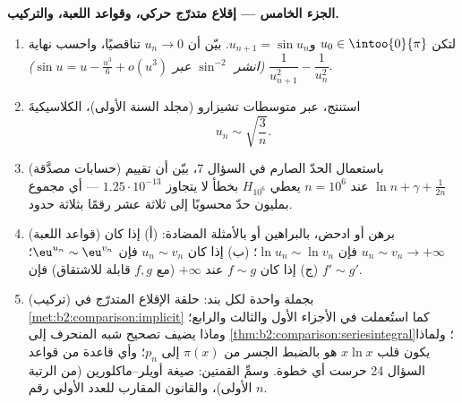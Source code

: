 \begin{problem}
\medskip
\noindent\textbf{الجزء الخامس --- إقلاع متدرّج حركي، وقواعد
اللعبة، والتركيب.}
\begin{enumerate}[resume]
  \item لتكن $u_0 \in \intoo{0}{\pi}$ و$u_{n+1} = \sin u_n$.
        بيّن أن $u_n \to 0$ تناقصيًا، واحسب نهاية
        $\dfrac{1}{u_{n+1}^2} - \dfrac{1}{u_n^2}$ \emph{(انشر
        $\sin^{-2}$ عبر $\sin u = u - \frac{u^3}6 + o(u^3)$)}.
  \item استنتج، عبر متوسطات تشيزارو (مجلد السنة الأولى)، الكلاسيكيةَ
        \[
        u_n \sim \sqrt{\frac{3}{n}} .
        \]
  \item (حسابات مصدَّقة) باستعمال الحدّ الصارم في السؤال 7،
        بيّن أن تقييم $\ln n + \gamma + \frac1{2n}$ عند $n
        = 10^6$ يعطي $H_{10^6}$ بخطأ لا يتجاوز
        $1.25\cdot10^{-13}$ --- أي مجموع بمليون حدّ محسوبًا إلى
        ثلاثة عشر رقمًا بثلاثة حدود.
  \item (قواعد اللعبة) برهن أو ادحض، بالبراهين أو
        بالأمثلة المضادة: (أ) إذا كان $u_n \sim v_n \to +\infty$ فإن
        $\ln u_n \sim \ln v_n$؛ (ب) إذا كان $u_n \sim v_n$ فإن
        $\eu^{u_n} \sim \eu^{v_n}$؛ (ج) إذا كان $f \sim g$ عند
        $+\infty$ (مع $f, g$ قابلة للاشتقاق) فإن $f' \sim g'$.
  \item (تركيب) بجملة واحدة لكل بند: حلقة الإقلاع المتدرّج في
        \cref{met:b2:comparison:implicit} كما استُعملت في الأجزاء الأول
        والثالث والرابع؛ وماذا يضيف تصحيح شبه المنحرف إلى
        \cref{thm:b2:comparison:seriesintegral}؛ ولماذا يكون قلب
        $x\ln x$ هو بالضبط الجسر من $\pi(x)$ إلى
        $p_n$؛ وأي قاعدة من قواعد السؤال 24 حرست أي
        خطوة. وسمِّ القمتين: صيغة أويلر--ماكلورين
        (من الرتبة الأولى)، والقانون المقارب للعدد الأولي رقم $n$.
\end{enumerate}
\end{problem}

